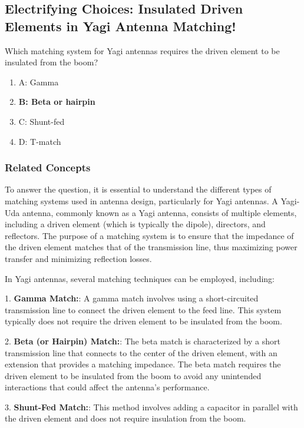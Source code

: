 \subsection{Electrifying Choices: Insulated Driven Elements in Yagi Antenna Matching!}

\begin{tcolorbox}[colback=gray!10, colframe=black, title=E9E01] 

Which matching system for Yagi antennas requires the driven element to be insulated from the boom?
\begin{enumerate}[label=\Alph*)]
    \item A: Gamma
    \item \textbf{B: Beta or hairpin}
    \item C: Shunt-fed
    \item D: T-match
\end{enumerate} \end{tcolorbox}

\subsubsection{Related Concepts}

To answer the question, it is essential to understand the different types of matching systems used in antenna design, particularly for Yagi antennas. A Yagi-Uda antenna, commonly known as a Yagi antenna, consists of multiple elements, including a driven element (which is typically the dipole), directors, and reflectors. The purpose of a matching system is to ensure that the impedance of the driven element matches that of the transmission line, thus maximizing power transfer and minimizing reflection losses.

In Yagi antennas, several matching techniques can be employed, including:

1. \textbf{Gamma Match:}: A gamma match involves using a short-circuited transmission line to connect the driven element to the feed line. This system typically does not require the driven element to be insulated from the boom.

2. \textbf{Beta (or Hairpin) Match:}: The beta match is characterized by a short transmission line that connects to the center of the driven element, with an extension that provides a matching impedance. The beta match requires the driven element to be insulated from the boom to avoid any unintended interactions that could affect the antenna's performance.

3. \textbf{Shunt-Fed Match:}: This method involves adding a capacitor in parallel with the driven element and does not require insulation from the boom.

